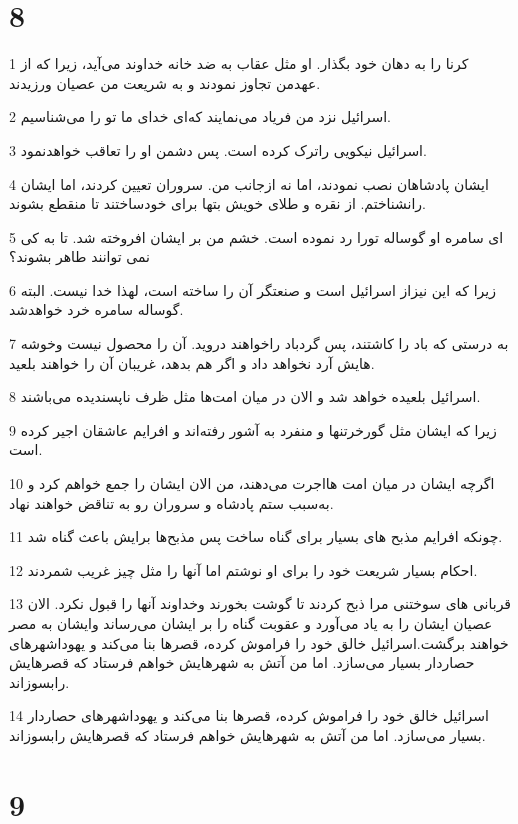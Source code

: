 \chapter{8}

\par 1 کرنا را به دهان خود بگذار. او مثل عقاب به ضد خانه خداوند می‌آید، زیرا که از عهدمن تجاوز نمودند و به شریعت من عصیان ورزیدند.
\par 2 اسرائیل نزد من فریاد می‌نمایند که‌ای خدای ما تو را می‌شناسیم.
\par 3 اسرائیل نیکویی راترک کرده است. پس دشمن او را تعاقب خواهدنمود.
\par 4 ایشان پادشاهان نصب نمودند، اما نه ازجانب من. سروران تعیین کردند، اما ایشان رانشناختم. از نقره و طلای خویش بتها برای خودساختند تا منقطع بشوند.
\par 5 ‌ای سامره او گوساله تورا رد نموده است. خشم من بر ایشان افروخته شد. تا به کی نمی توانند طاهر بشوند؟
\par 6 زیرا که این نیزاز اسرائیل است و صنعتگر آن را ساخته است، لهذا خدا نیست. البته گوساله سامره خرد خواهدشد.
\par 7 به درستی که باد را کاشتند، پس گردباد راخواهند دروید. آن را محصول نیست وخوشه هایش آرد نخواهد داد و اگر هم بدهد، غریبان آن را خواهند بلعید.
\par 8 اسرائیل بلعیده خواهد شد و الان در میان امت‌ها مثل ظرف ناپسندیده می‌باشند.
\par 9 زیرا که ایشان مثل گورخرتنها و منفرد به آشور رفته‌اند و افرایم عاشقان اجیر کرده است.
\par 10 اگر‌چه ایشان در میان امت هااجرت می‌دهند، من الان ایشان را جمع خواهم کرد و به‌سبب ستم پادشاه و سروران رو به تناقض خواهند نهاد.
\par 11 چونکه افرایم مذبح های بسیار برای گناه ساخت پس مذبح‌ها برایش باعث گناه شد.
\par 12 احکام بسیار شریعت خود را برای او نوشتم اما آنها را مثل چیز غریب شمردند.
\par 13 قربانی های سوختنی مرا ذبح کردند تا گوشت بخورند وخداوند آنها را قبول نکرد. الان عصیان ایشان را به یاد می‌آورد و عقوبت گناه را بر ایشان می‌رساند وایشان به مصر خواهند برگشت.اسرائیل خالق خود را فراموش کرده، قصرها بنا می‌کند و یهوداشهرهای حصاردار بسیار می‌سازد. اما من آتش به شهرهایش خواهم فرستاد که قصرهایش رابسوزاند.
\par 14 اسرائیل خالق خود را فراموش کرده، قصرها بنا می‌کند و یهوداشهرهای حصاردار بسیار می‌سازد. اما من آتش به شهرهایش خواهم فرستاد که قصرهایش رابسوزاند.

\chapter{9}

